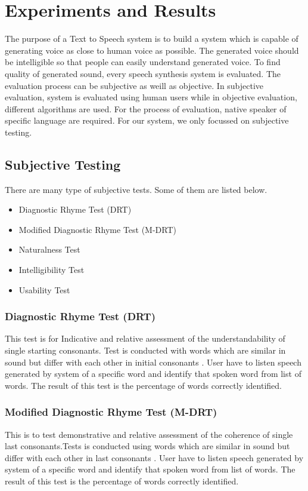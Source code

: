 \chapter{Experiments and Results}

The purpose of a Text to Speech system is to build a system which is capable of generating voice as close to human voice as possible. 
The generated voice should be intelligible so that people can easily understand generated voice. To find quality of generated sound, every speech synthesis 
system is evaluated. The evaluation process can be subjective as weill as objective. In subjective evaluation, system is evaluated using human users while in objective 
evaluation, different algorithms are used. For the process of evaluation, native speaker of specific language are required. For our system, we only focussed on subjective testing. 

\section{Subjective Testing}

There are many type of subjective tests. Some of them are listed below.

\begin{itemize}
  \item Diagnostic Rhyme Test (DRT)
  \item Modified Diagnostic Rhyme Test (M-DRT)
  \item Naturalness Test
  \item Intelligibility Test
  \item Usability Test
\end{itemize}

\subsection{Diagnostic Rhyme Test (DRT)}
This test is for Indicative and relative assessment of the understandability of single starting consonants. Test is conducted with words which are similar in sound but differ with each other in initial consonants \cite{voiers1977diagnostic}. User have to listen speech generated by system of a specific word and identify that spoken word from list of words. The result of this test is the percentage of words correctly identified.

\subsection{Modified Diagnostic Rhyme Test (M-DRT)}
This is to test demonstrative and relative assessment of the coherence of single last consonants.Tests is conducted using words which are similar in sound but differ with each other in last consonants \cite{house1965articulation}. User have to listen speech generated by system of a specific word and identify that spoken word from list of words. The result of this test is the percentage of words correctly identified.

